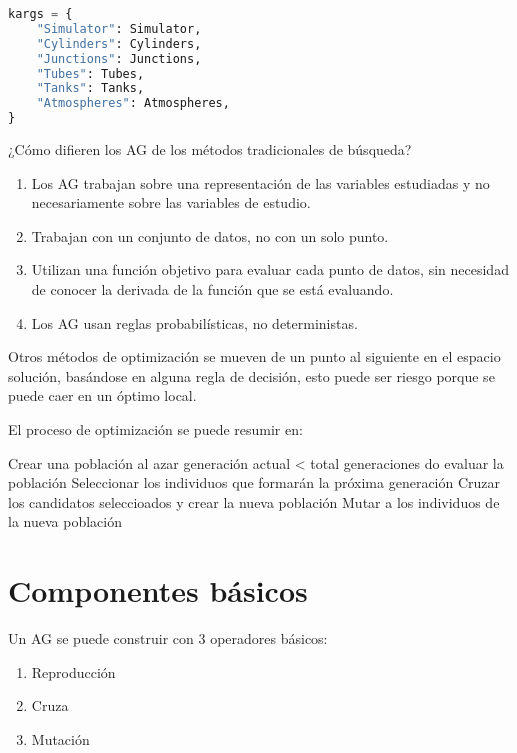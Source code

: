 \begin{lstlisting}[language=Python]
kargs = {
    "Simulator": Simulator,
    "Cylinders": Cylinders,
    "Junctions": Junctions,
    "Tubes": Tubes,
    "Tanks": Tanks,
    "Atmospheres": Atmospheres,
}
\end{lstlisting}



¿Cómo difieren los AG de los métodos tradicionales de búsqueda?
%
\begin{enumerate}
  \item Los AG trabajan sobre una representación de las variables estudiadas y
      no necesariamente sobre las variables de estudio.
    \item Trabajan con un conjunto de datos, no con un solo punto.
    \item Utilizan una función objetivo para evaluar cada punto de datos, sin
        necesidad de conocer la derivada de la función que se está evaluando.
    \item Los AG usan reglas probabilísticas, no deterministas.
\end{enumerate}


Otros métodos de optimización se mueven de un punto al siguiente en el espacio
solución, basándose en alguna regla de decisión, esto puede ser riesgo porque
se puede caer en un óptimo local.

El proceso de optimización se puede resumir en:

Crear una población al azar
generación actual < total generaciones do
evaluar la población
Seleccionar los individuos que formarán la próxima generación
Cruzar los candidatos seleccioados y crear la nueva población
Mutar a los individuos de la nueva población


\section{Componentes básicos}
%
Un AG se puede construir con 3 operadores básicos:
\begin{enumerate}
    \item Reproducción
    \item Cruza
    \item Mutación
\end{enumerate}

